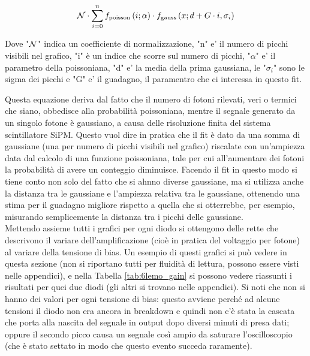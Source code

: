 \begin{equation}
	{\cal N}\cdot\sum_{i=0}^{n}f_{\mathrm{poisson}}\left(i;\alpha\right)\cdot f_{\mathrm{gauss}}\left(x; d + G\cdot i, \sigma_i\right)
	\label{eq:segnale_buio}
\end{equation}

Dove "${\cal N}$" indica un coefficiente di normalizzazione, "n" e' il numero di picchi visibili nel grafico, "i" \`e un indice che scorre sul numero di picchi, "$\alpha$" e' il parametro della poissoniana, "d" e' la media della prima gaussiana, le "$\sigma_i$" sono le sigma dei picchi e "G" e' il guadagno, il paramentro che ci interessa in questo fit.

Questa equazione deriva dal fatto che il numero di fotoni rilevati, veri o termici che siano, obbedisce alla probabilit\`a poissoniana, mentre il segnale generato da un singolo fotone \`e gaussiano, a causa delle risoluzione finita del sistema scintillatore SiPM. Questo vuol dire in pratica che il fit è dato da una somma di gaussiane (una per numero di picchi visibili nel grafico) riscalate con un'ampiezza data dal calcolo di una funzione poissoniana, tale per cui all'aumentare dei fotoni la probabilità di avere un conteggio
diminuisce. Facendo il fit in questo modo si tiene conto non solo del fatto che si ahnno diverse gaussiane, ma si utilizza anche la distanza tra le gaussiane e  l'ampiezza
relativa tra le gaussiane, ottenendo una stima per il guadagno migliore rispetto a quella che si otterrebbe, per esempio, misurando semplicemente la distanza tra i picchi delle gaussiane.\\

Mettendo assieme tutti i grafici per ogni diodo si ottengono delle rette che descrivono il variare dell'amplificazione (cioè in pratica del voltaggio per fotone) al variare
della tensione di bias. Un esempio di questi grafici si può vedere in questa sezione (non si riportano tutti per fluidità di lettura, possono essere visti nelle appendici), e nella Tabella \ref{tab:6lemo_gain} si possono vedere riassunti i risultati per quei due diodi (gli altri si trovano nelle appendici). Si noti che non si hanno dei valori per ogni tensione
di bias: questo avviene perché ad alcune tensioni il diodo non era ancora in breakdown e quindi non c'è stata la cascata che porta alla nascita del segnale in output dopo diversi minuti di presa dati; oppure il secondo picco causa un segnale così ampio da saturare l'oscilloscopio (che è stato settato in modo che questo evento succeda raramente).

